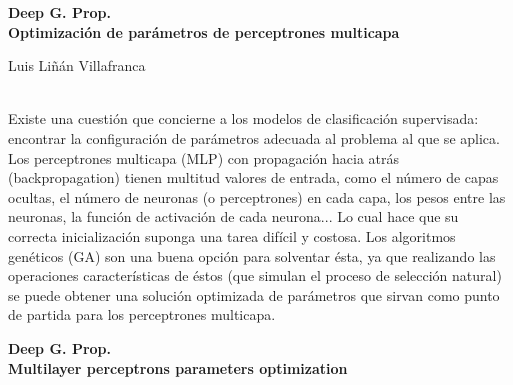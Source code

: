 \thispagestyle{empty}

\begin{center}

{\large\bfseries Deep G. Prop. \\ Optimización de parámetros de perceptrones
multicapa}\\

\end{center}

\begin{center}

    Luis Liñán Villafranca \\

\end{center}

\vspace{0.7cm}

\vspace{0.5cm}
\vspace{0.7cm}

\\

Existe una cuestión que concierne a los modelos de clasificación supervisada:
encontrar la configuración de parámetros adecuada al problema al que se aplica.
Los perceptrones multicapa (MLP) con propagación hacia atrás (backpropagation)
tienen multitud valores de entrada, como el número de capas ocultas, el número
de neuronas (o perceptrones) en cada capa, los pesos entre las neuronas, la
función de activación de cada neurona... Lo cual hace que su correcta
inicialización suponga una tarea difícil y costosa. Los algoritmos genéticos
(GA) son una buena opción para solventar ésta, ya que realizando las
operaciones características de éstos (que simulan el proceso de selección
natural) se puede obtener una solución optimizada de parámetros que sirvan como
punto de partida para los perceptrones multicapa.

\cleardoublepage

\begin{center}

    {\large\bfseries Deep G. Prop. \\ Multilayer perceptrons parameters
    optimization}\\

\end{center}

